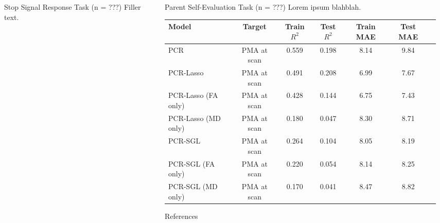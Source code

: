 \documentclass[final]{beamer}
\newlength{\sepwidth}
\newlength{\colwidth}
\newcommand{\separatorcolumn}{\begin{column}{\sepwidth}\end{column}}
\begin{document}
\begin{frame}[t]
\begin{columns}[t]
\begin{column}{\colwidth}
\begin{block}{Stop Signal Response Task (n = ???)}
    Filler text.
    
  \end{block}
\end{column}

\separatorcolumn

\begin{column}{\colwidth}
  \begin{block}{Parent Self-Evaluation Task (n = ???)}
    Lorem ipsum blahblah.

            \begin{table}[ht]
      \centering
      \fontsize{9}{11}\selectfont
      \begin{tabularx}{\textwidth}{l c c c c c c}
        \toprule
        \textbf{Model} & \textbf{Target} & \textbf{Train $R^2$} & \textbf{Test $R^2$} & \textbf{Train MAE} &
        \textbf{Test MAE} \\
        \midrule
         PCR & PMA at scan & 0.559 & 0.198 & 8.14 & 9.84 \\
        \midrule
        \rowcolor{yellow!50} PCR-Lasso & PMA at scan & 0.491 & 0.208 & 6.99 & 7.67 \\
        PCR-Lasso (FA only) & PMA at scan & 0.428 & 0.144 & 6.75 & 7.43 \\
        PCR-Lasso (MD only) & PMA at scan & 0.180 & 0.047 & 8.30 & 8.71 \\
        \midrule
        \rowcolor{yellow!50} PCR-SGL & PMA at scan & 0.264 & 0.104 & 8.05 & 8.19 \\
        PCR-SGL (FA only) & PMA at scan & 0.220 & 0.054 & 8.14 & 8.25 \\
        PCR-SGL (MD only) & PMA at scan & 0.170 & 0.041 & 8.47 & 8.82 \\
        \bottomrule
      \end{tabularx}
    \end{table}
    
  \end{block}
  
  \begin{block}{References}
    \nocite{*}
    \renewcommand{\bibfont}{\fontsize{8}{10}\selectfont}
    \printbibliography[heading=none]
  \end{block}
\end{column}

\separatorcolumn
\end{columns}
\end{frame}
\end{document}
